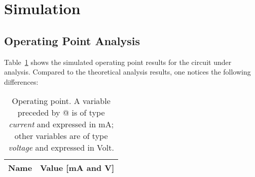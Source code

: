 \section{Simulation}

\label{sec:simulation}

\subsection{Operating Point Analysis}

Table~\ref{tab:op} shows the simulated operating point results for the circuit
under analysis. Compared to the theoretical analysis results, one notices the
following differences:

\begin{table}[h]
  \centering
  \begin{tabular}{|l|r|}
    \hline    
    {\bf Name} & {\bf Value [mA and V]} \\ \hline
    
  \end{tabular}
  \caption{Operating point. A variable preceded by @ is of type {\em current}
    and expressed in mA; other variables are of type {\it voltage} and expressed in
    Volt.}
  \label{tab:op}
\end{table}

\lipsum[1-1]

